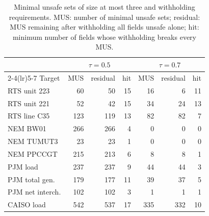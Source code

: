 \begin{table}[H]
\centering\small
\caption{Minimal unsafe sets of size at most three and withholding requirements. MUS: number of minimal unsafe sets; residual: MUS remaining after withholding all fields unsafe alone; hit: minimum number of fields whose withholding breaks every MUS.}\label{tab:risk-sets}
\setlength{\tabcolsep}{5pt}
\begin{tabular}{lrrrrrr}
\toprule
 & \multicolumn{3}{c}{$\tau=0.5$} & \multicolumn{3}{c}{$\tau=0.7$}\\
\cmidrule(lr){2-4}\cmidrule(lr){5-7}
Target & MUS & residual & hit & MUS & residual & hit\\
\midrule
RTS unit 223 & 60 & 50 & 15 & 16 & 6 & 11 \\
RTS unit 221 & 52 & 42 & 15 & 34 & 24 & 13 \\
RTS line C35 & 123 & 119 & 13 & 82 & 82 & 7 \\
NEM BW01 & 266 & 266 & 4 & 0 & 0 & 0 \\
NEM TUMUT3 & 23 & 23 & 1 & 0 & 0 & 0 \\
NEM PPCCGT & 215 & 213 & 6 & 8 & 8 & 1 \\
PJM load & 237 & 237 & 9 & 44 & 44 & 3 \\
PJM total gen. & 179 & 177 & 11 & 39 & 37 & 5 \\
PJM net interch. & 102 & 102 & 3 & 1 & 1 & 1 \\
CAISO load & 542 & 537 & 17 & 335 & 332 & 10 \\
\bottomrule
\end{tabular}
\end{table}
